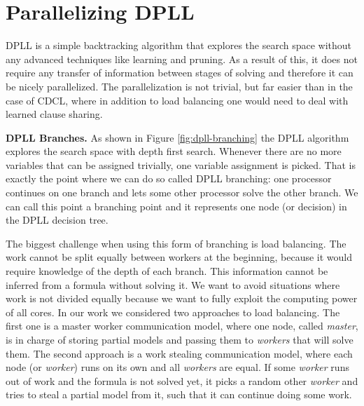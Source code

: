 \documentclass[letterpaper]{article}
\newcommand{\mypar}[1]{{\bf #1.}}
\begin{document}
\section{Parallelizing DPLL}\label{sec:parallel_dpll}

DPLL is a simple backtracking algorithm that explores the search space without any advanced techniques like learning and pruning.
As a result of this, it does not require any transfer of information between stages of solving and therefore it can be nicely parallelized.
The parallelization is not trivial, but far easier than in the case of CDCL, where in addition to load balancing one would need to deal with learned clause sharing.

\mypar{DPLL Branches}
As shown in Figure \ref{fig:dpll-branching} the DPLL algorithm explores the search space with depth first search.
Whenever there are no more variables that can be assigned trivially, one variable assignment is picked.
That is exactly the point where we can do so called DPLL branching: one processor continues on one branch and lets some other processor solve the other branch.
We can call this point a branching point and it represents one node (or decision) in the DPLL decision tree.

The biggest challenge when using this form of branching is load balancing.
The work cannot be split equally between workers at the beginning, because it would require knowledge of the depth of each branch.
This information cannot be inferred from a formula without solving it.
We want to avoid situations where work is not divided equally because we want to fully exploit the computing power of all cores.
In our work we considered two approaches to load balancing.
The first one is a master worker communication model, where one node, called \textit{master}, is in charge of storing partial models and passing them to \textit{workers} that will solve them.
The second approach is a work stealing communication model, where each node (or \textit{worker}) runs on its own and all \textit{workers} are equal.
If some \textit{worker} runs out of work and the formula is not solved yet, it picks a random other \textit{worker} and tries to steal a partial model from it, such that it can continue doing some work.
\end{document}
